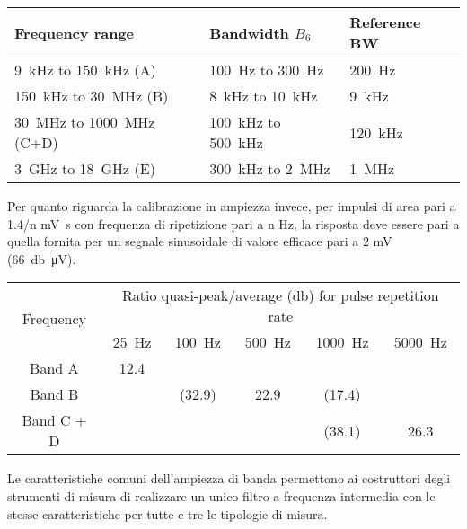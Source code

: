 \begin{center} %
 \begin{tabular}{|>{\centering}m{5cm}|>{\centering}m{3.2cm}|m{3.2cm}<{\centering}|}
  \hline
    \textbf{Frequency range} & \textbf{Bandwidth $B_6$} & \textbf{Reference BW}  \\ \hline
    \SI{9}{\kilo\hertz}   to \SI{150}{\kilo\hertz}  (A)   & \SI{100}{\hertz}      to \SI{300}{\hertz}      & \SI{200}{\hertz}      \\ \hline
    \SI{150}{\kilo\hertz} to \SI{30}{\mega\hertz}   (B)   & \SI{8}{\kilo\hertz}   to \SI{10}{\kilo\hertz}  & \SI{9}{\kilo\hertz}   \\ \hline
    \SI{30}{\mega\hertz}  to \SI{1000}{\mega\hertz} (C+D) & \SI{100}{\kilo\hertz} to \SI{500}{\kilo\hertz} & \SI{120}{\kilo\hertz} \\ \hline
    \SI{3}{\giga\hertz}   to \SI{18}{\giga\hertz}   (E)   & \SI{300}{\kilo\hertz} to \SI{2}{\mega\hertz}   & \SI{1}{\mega\hertz}   \\ \hline
 \end{tabular}
\end{center}

Per quanto riguarda la calibrazione in ampiezza invece, per impulsi di area pari a 
1.4/n \si{\milli\volt\second} con frequenza di ripetizione pari a n \si{\hertz},
la risposta deve essere pari a quella fornita per un segnale sinusoidale di valore efficace
pari a 2 \si{\milli\volt} (\SI{66}{\decibel\micro\volt}).

\begin{table}[h] %
\centering
\begin{tabular}{|c|c|c|c|c|c|}
\hline
\multirow{3}{*}{Frequency} & \multicolumn{5}{c|}{\multirow{2}{*}{Ratio quasi-peak/average (\si{\decibel}) for pulse repetition rate}} \\
                           & \multicolumn{5}{c|}{}                                                                                 \\ \cline{2-6} 
                           & \SI{25}{\hertz}    & \SI{100}{\hertz}   & \SI{500}{\hertz}   & \SI{1000}{\hertz}  & \SI{5000}{\hertz} \\ \hline
Band A                     & 12.4               &                    &                    &                    &                   \\ \hline
Band B                     &                    & (32.9)             & 22.9               & (17.4)             &                   \\ \hline
Band C + D                 &                    &                    &                    & (38.1)             & 26.3              \\ \hline
\end{tabular}
\end{table}

Le caratteristiche comuni dell'ampiezza di banda permettono ai costruttori degli strumenti
di misura di realizzare un unico filtro a frequenza intermedia con le stesse
caratteristiche per tutte e tre le tipologie di misura.

